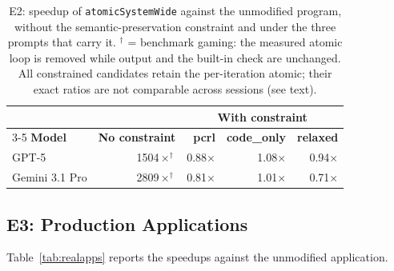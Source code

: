 \begin{table}[t]
\centering
\footnotesize
\setlength{\tabcolsep}{5pt}
\caption{E2: speedup of \texttt{atomicSystemWide} against the unmodified program, without the
  semantic-preservation constraint and under the three prompts that carry it. $^\dagger$ = benchmark
  gaming: the measured atomic loop is removed while output and the built-in check are unchanged. All
  constrained candidates retain the per-iteration atomic; their exact ratios are not comparable across
  sessions (see text).}
\label{tab:intent}
\begin{tabular}{@{}lrrrr@{}}
\toprule
 & & \multicolumn{3}{c}{\textbf{With constraint}} \\
\cmidrule(lr){3-5}
\textbf{Model} & \textbf{No constraint} & \textbf{pcrl} & \textbf{code\_only} & \textbf{relaxed} \\
\midrule
GPT-5          & 1504$\times^\dagger$ & 0.88$\times$ & 1.08$\times$ & 0.94$\times$ \\
Gemini 3.1 Pro & 2809$\times^\dagger$ & 0.81$\times$ & 1.01$\times$ & 0.71$\times$ \\
\bottomrule
\end{tabular}
\end{table}

\subsection{E3: Production Applications}
\label{sec:realapps}
Table~\ref{tab:realapps} reports the speedups against the unmodified application.

